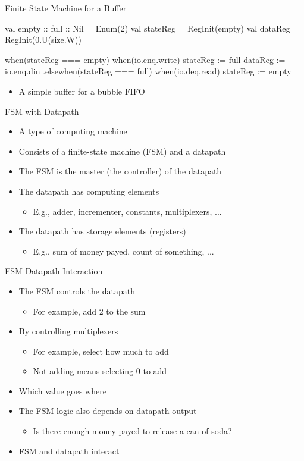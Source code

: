 \begin{frame}[fragile]{Finite State Machine for a Buffer}
\begin{chisel}
  val empty :: full :: Nil = Enum(2)
  val stateReg = RegInit(empty)
  val dataReg = RegInit(0.U(size.W))

  when(stateReg === empty) {
    when(io.enq.write) {
      stateReg := full
      dataReg := io.enq.din
    }
  }.elsewhen(stateReg === full) {
    when(io.deq.read) {
      stateReg := empty
    }
  }
\end{chisel}
\begin{itemize}
\item A simple buffer for a bubble FIFO
\end{itemize}
\end{frame}


\begin{frame}[fragile]{FSM with Datapath}
\begin{itemize}
\item A type of computing machine
\item Consists of a finite-state machine (FSM) and a datapath
\item The FSM is the master (the controller) of the datapath
\item The datapath has computing elements
\begin{itemize}
\item E.g., adder, incrementer, constants, multiplexers, ...
\end{itemize}
\item The datapath has storage elements (registers)
\begin{itemize}
\item E.g., sum of money payed, count of something, ...
\end{itemize}
\end{itemize}
\end{frame}

\begin{frame}[fragile]{FSM-Datapath Interaction}
\begin{itemize}
\item The FSM controls the datapath
\begin{itemize}
\item For example, add 2 to the sum
\end{itemize}
\item By controlling multiplexers
\begin{itemize}
\item For example, select how much to add
\item Not adding means selecting 0 to add
\end{itemize}
\item Which value goes where
\item The FSM logic also depends on datapath output
\begin{itemize}
\item Is there enough money payed to release a can of soda?
\end{itemize}
\item FSM and datapath interact
\end{itemize}
\end{frame}


